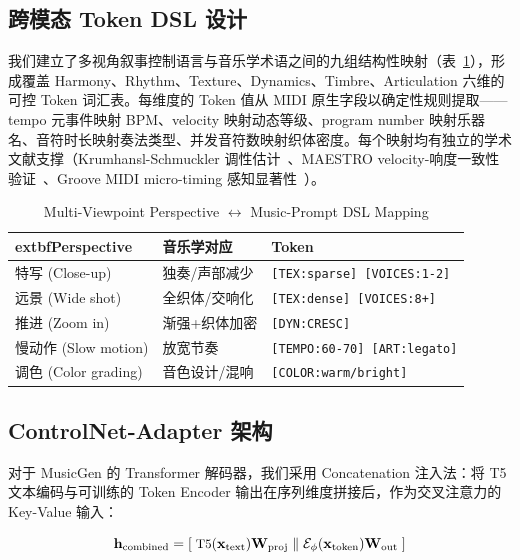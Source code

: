\documentclass[11pt,twocolumn]{article}
\begin{document}
\subsection{跨模态 Token DSL 设计}

我们建立了多视角叙事控制语言与音乐学术语之间的九组结构性映射（表~\ref{tab:mapping}），形成覆盖 Harmony、Rhythm、Texture、Dynamics、Timbre、Articulation 六维的可控 Token 词汇表。每维度的 Token 值从 MIDI 原生字段以确定性规则提取——tempo 元事件映射 BPM、velocity 映射动态等级、program number 映射乐器名、音符时长映射奏法类型、并发音符数映射织体密度。每个映射均有独立的学术文献支撑（Krumhansl-Schmuckler 调性估计~\cite{krumhansl}、MAESTRO velocity-响度一致性验证~\cite{maestro}、Groove MIDI micro-timing 感知显著性~\cite{groove}）。

\begin{table}[t]
\centering\footnotesize
\caption{Multi-Viewpoint Perspective $\leftrightarrow$ Music-Prompt DSL Mapping}
\label{tab:mapping}
\begin{tabularx}{\columnwidth}{@{}l >{\raggedright\arraybackslash}X >{\raggedright\arraybackslash}X@{}}
\toprule
	extbf{Perspective} & \textbf{音乐学对应} & \textbf{Token} \\
\midrule
特写 (Close-up) & 独奏/声部减少 & \texttt{[TEX:sparse] [VOICES:1-2]} \\
远景 (Wide shot) & 全织体/交响化 & \texttt{[TEX:dense] [VOICES:8+]} \\
推进 (Zoom in) & 渐强+织体加密 & \texttt{[DYN:CRESC]} \\
慢动作 (Slow motion) & 放宽节奏 & \texttt{[TEMPO:60-70] [ART:legato]} \\
调色 (Color grading) & 音色设计/混响 & \texttt{[COLOR:warm/bright]} \\
\bottomrule
\end{tabularx}
\end{table}

\subsection{ControlNet-Adapter 架构}

对于 MusicGen 的 Transformer 解码器，我们采用 Concatenation 注入法：将 T5 文本编码与可训练的 Token Encoder 输出在序列维度拼接后，作为交叉注意力的 Key-Value 输入：

\begin{equation}\small
\mathbf{h}_{\text{combined}} = [\;\text{T5}(\mathbf{x}_{\text{text}})\mathbf{W}_{\text{proj}}\;\|\;
\mathcal{E}_{\phi}(\mathbf{x}_{\text{token}})\mathbf{W}_{\text{out}}\;]
\end{equation}
\end{document}
